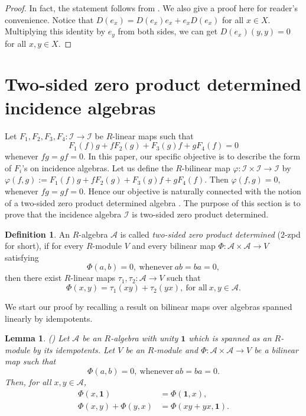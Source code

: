 \documentclass[reqno]{amsart}
\numberwithin{equation}{section}
\theoremstyle{plain}
\newtheorem{lemma}[theorem]{Lemma}
\theoremstyle{definition}
\newtheorem{definition}[theorem]{Definition}
\newcommand{\I}{\mathcal I}
\newcommand{\one}{\mathbf 1}
\begin{document}
\begin{proof}
In fact, the statement follows from \cite[Theorem 2.2]{Xiao}.
We also give a proof here for reader's convenience. Notice that
$D(e_x)=D(e_x)e_x+e_xD(e_x)$ for all $x\in X$.
Multiplying this identity by $e_y$ from both sides,
we can get $D(e_x)(y,y)=0$ for all $x,y\in X$.
\end{proof}


\section{Two-sided zero product determined incidence algebras}\label{sec:two-sided-zpd}

Let $F_1, F_2, F_3, F_4: \I \rightarrow \I$ be $R$-linear maps such that
\[
F_1(f)g+fF_2(g)+F_3(g)f+gF_4(f)=0
\]
whenever $fg=gf=0$. In this paper, our specific objective is to
describe the form of $F_i$'s on incidence algebras. Let us define the $R$-bilinear map
$\varphi: \I\times\I \rightarrow \I$ by $\varphi(f,g):=F_1(f)g+fF_2(g)+F_3(g)f+gF_4(f)$.
Then $\varphi(f,g)=0$, whenever $fg=gf=0$. Hence our objective is naturally connected with the
notion of a two-sided zero product determined algebra \cite{BajukBresar22}.
The purpose of this section is to prove that the incidence algebra $\I$ is two-sided zero product determined.

\begin{definition}\label{def:two-sided-zpd}
An $R$-algebra $\mathcal A$ is called \emph{two-sided zero product
determined} ($2$-zpd for short), if for every $R$-module
$V$ and every bilinear map $\Phi:\mathcal A\times\mathcal A\to V$
satisfying
\[
\Phi(a,b)=0,~\text{whenever}~ab=ba=0,
\]
then there exist $R$-linear maps $\tau_1,\tau_2:\mathcal A\to V$ such that
\[
\Phi(x,y)=\tau_1(xy)+\tau_2(yx),~\text{for~all}~x,y\in\mathcal A.
\]
\end{definition}

We start our proof by recalling a result on bilinear maps over algebras spanned linearly by idempotents.

\begin{lemma}{\rm (\cite[Theorem 3.5]{Ghahramani14})} \label{lem:idempotent-bilinear}
Let $\mathcal A$ be an $R$-algebra with unity $\one$ which is spanned as an $R$-module by
its idempotents. Let $V$ be an $R$-module and
$\Phi:\mathcal A\times\mathcal A\to V$ be a bilinear map such that
\[
\Phi(a,b)=0,~\text{whenever}~ab=ba=0.
\]
Then, for all $x,y\in\mathcal A$,
\begin{align}
\Phi(x,\one)&=\Phi(\one,x),
\label{eq:phi-unit-symmetry}\\
\Phi(x,y)+\Phi(y,x)&=\Phi(xy+yx,\one).
\label{eq:phi-jordan-unit}
\end{align}
\end{lemma}
\end{document}

